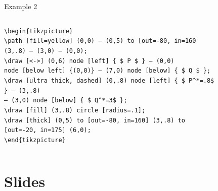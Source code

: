 \documentclass[
11pt, %
]{beamer}
\begin{document}
		\begin{frame}{Example 2}
    \begin{columns}[onlytextwidth] %
        \begin{column}{0.7\textwidth}
            \texttt{\textbackslash begin\{tikzpicture\}} \\
\texttt{\textbackslash path [fill=yellow] (0,0) -- (0,5) to [out=-80, in=160} \\
\texttt{(3,.8) -- (3,0) -- (0,0);} \\
\texttt{\textbackslash draw [<->] (0,6) node [left] \{\ \$ P \$ \} -- (0,0)} \\
\texttt{node [below left] \{(0,0)\} -- (7,0) node [below] \{\ \$ Q \$ \};} \\
\texttt{\textbackslash draw [ultra thick, dashed] (0,.8) node [left] \{\ \$ P\^{}*=.8\$ \} -- (3,.8)} \\
\texttt{-- (3,0) node [below] \{\ \$ Q\^{}*=3\$ \};} \\
\texttt{\textbackslash draw [fill] (3,.8) circle [radius=.1];} \\
\texttt{\textbackslash draw [thick] (0,5) to [out=-80, in=160] (3,.8) to} \\
\texttt{[out=-20, in=175] (6,0);} \\
\texttt{\textbackslash end\{tikzpicture\}}

        \end{column}
        
        \begin{column}{0.3\textwidth}
            \begin{figure}
            \end{figure}
        \end{column}
    \end{columns}
    
	\end{frame}
	
	\section{Slides}
	
\end{document}
